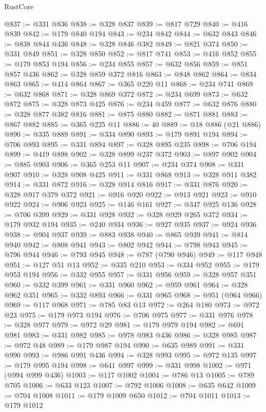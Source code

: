 \begin{lexlean}{RustCore}
\begin{coremodule}
@837 := @331 @836
@838 := @328 @837
@839 := @817 @729
@840 := @416 @839
@842 := @179 @840 @194
@843 := @234 @842
@844 := @632 @843
@846 := @838 @844 @436
@848 := @328 @846 @382
@849 := @821 @374
@850 := @331 @849
@851 := @328 @850
@852 := @817 @741
@853 := @416 @852
@855 := @179 @853 @194
@856 := @234 @855
@857 := @632 @856
@859 := @851 @857 @436
@862 := @328 @859 @372 @816
@863 := @848 @862
@864 := @834 @863
@865 := @414 @864
@867 := @365 @220 @11
@868 := @234 @741
@869 := @632 @868
@871 := @328 @869 @372
@872 := @234 @699
@873 := @632 @872
@875 := @328 @873 @425
@876 := @234 @459
@877 := @632 @876
@880 := @328 @877 @382 @816
@881 := @875 @880
@882 := @871 @881
@883 := @867 @882
@885 := @365 @225 @11
@886 := 40
@889 := @18 @886 (@21 @886)
@890 := @335 @889
@891 := @334 @890
@893 := @179 @891 @194
@894 := @706 @893
@895 := @331 @894
@897 := @328 @895 @235
@898 := @706 @194
@899 := @419 @898
@902 := @328 @899 @237 @372
@903 := @897 @902
@904 := @885 @903
@906 := @365 @253 @11
@907 := @234 @374
@908 := @331 @907
@910 := @328 @908 @425
@911 := @331 @868
@913 := @328 @911 @382
@914 := @331 @872
@916 := @328 @914 @816
@917 := @331 @876
@920 := @328 @917 @379 @372
@921 := @916 @920
@922 := @913 @921
@923 := @910 @922
@924 := @906 @923
@925 := @146 @161
@927 := @347 @925 @136
@928 := @706 @399
@929 := @331 @928
@932 := @328 @929 @265 @372
@934 := @179 @932 @194
@935 := @240 @934
@936 := @927 @935
@937 := @924 @936
@938 := @904 @937
@939 := @883 @938
@940 := @865 @939
@941 := @814 @940
@942 := @808 @941
@943 := @802 @942
@944 := @798 @943
@945 := @796 @944
@946 := @793 @945
@948 := @787 (@790 @946)
@949 := @117 @948
@951 := @127 @51 @13
@952 := @335 @210
@953 := @334 @952
@955 := @179 @953 @194
@956 := @332 @955
@957 := @331 @956
@959 := @328 @957 @351
@960 := @332 @399
@961 := @331 @960
@962 := @959 @961
@964 := @328 @962 @351
@965 := @332 @893
@966 := @331 @965
@968 := @951 (@964 @966)
@969 := @117 @968
@971 := @785 @83 @13
@972 := @264 @180
@973 := @972 @23
@975 := @179 @973 @194
@976 := @706 @975
@977 := @331 @976
@978 := @328 @977
@979 := @972 @29
@981 := @179 @979 @194
@982 := @691 @981
@983 := @331 @982
@985 := @978 @983 @436
@986 := @328 @985
@987 := @972 @48
@989 := @179 @987 @194
@990 := @635 @989
@991 := @331 @990
@993 := @986 @991 @436
@994 := @328 @993
@995 := @972 @135
@997 := @179 @995 @194
@998 := @641 @997
@999 := @331 @998
@1002 := @971 (@994 @999 @436)
@1003 := @117 @1002
@1004 := @786 @13
@1005 := @789 @705
@1006 := @633 @123
@1007 := @792 @1006
@1008 := @635 @642
@1009 := @704 @1008
@1011 := @179 @1009 @650
@1012 := @704 @1011
@1013 := @179 @1012

\end{coremodule}
\end{lexlean}
